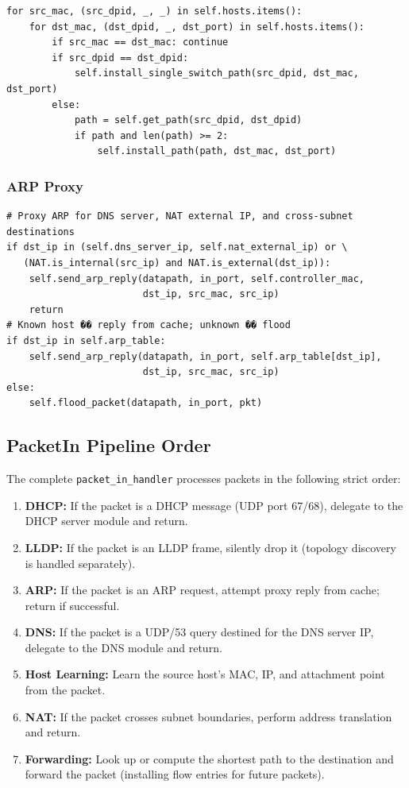 \documentclass[12pt,a4paper]{article}
\begin{document}
\begin{lstlisting}[caption={Recompute All Paths After Topology Change}]
for src_mac, (src_dpid, _, _) in self.hosts.items():
    for dst_mac, (dst_dpid, _, dst_port) in self.hosts.items():
        if src_mac == dst_mac: continue
        if src_dpid == dst_dpid:
            self.install_single_switch_path(src_dpid, dst_mac, dst_port)
        else:
            path = self.get_path(src_dpid, dst_dpid)
            if path and len(path) >= 2:
                self.install_path(path, dst_mac, dst_port)
\end{lstlisting}

\subsubsection{ARP Proxy}

\begin{lstlisting}[caption={ARP Proxy Handler}]
# Proxy ARP for DNS server, NAT external IP, and cross-subnet destinations
if dst_ip in (self.dns_server_ip, self.nat_external_ip) or \
   (NAT.is_internal(src_ip) and NAT.is_external(dst_ip)):
    self.send_arp_reply(datapath, in_port, self.controller_mac,
                        dst_ip, src_mac, src_ip)
    return
# Known host �� reply from cache; unknown �� flood
if dst_ip in self.arp_table:
    self.send_arp_reply(datapath, in_port, self.arp_table[dst_ip],
                        dst_ip, src_mac, src_ip)
else:
    self.flood_packet(datapath, in_port, pkt)
\end{lstlisting}

\subsection{PacketIn Pipeline Order}

The complete \texttt{packet\_in\_handler} processes packets in the following strict order:

\begin{enumerate}
    \item \textbf{DHCP:} If the packet is a DHCP message (UDP port 67/68), delegate to the DHCP server module and return.
    \item \textbf{LLDP:} If the packet is an LLDP frame, silently drop it (topology discovery is handled separately).
    \item \textbf{ARP:} If the packet is an ARP request, attempt proxy reply from cache; return if successful.
    \item \textbf{DNS:} If the packet is a UDP/53 query destined for the DNS server IP, delegate to the DNS module and return.
    \item \textbf{Host Learning:} Learn the source host's MAC, IP, and attachment point from the packet.
    \item \textbf{NAT:} If the packet crosses subnet boundaries, perform address translation and return.
    \item \textbf{Forwarding:} Look up or compute the shortest path to the destination and forward the packet (installing flow entries for future packets).
\end{enumerate}
\end{document}

